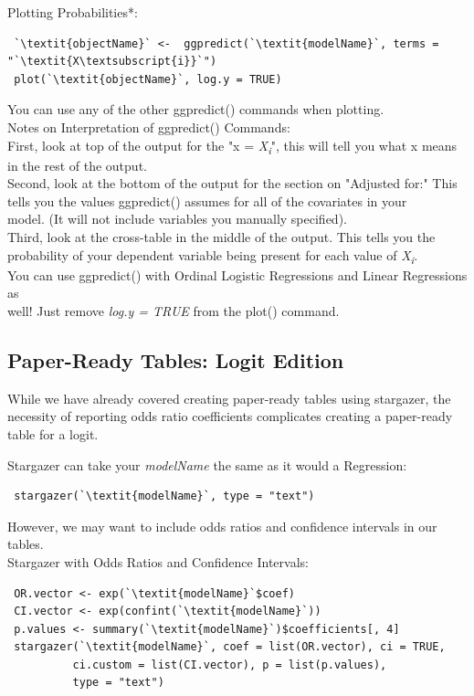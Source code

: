 \documentclass[12pt,letterpaper]{article}
\newcommand{\ind}{\phantom{AA}}
\begin{document}
\begin{tcolorbox}[title = Predicted Probabilities]
\begin{lstlisting}
\end{lstlisting}
Plotting Probabilities*: 
\begin{lstlisting}
 `\textit{objectName}` <-  ggpredict(`\textit{modelName}`, terms = "`\textit{X\textsubscript{i}}`")
 plot(`\textit{objectName}`, log.y = TRUE)
\end{lstlisting} {\small * You can use any of the other ggpredict() commands when plotting.} \vspace{.5em}\\
Notes on Interpretation of ggpredict() Commands: \\
\ind First, look at top of the output for the "x = \textit{X\textsubscript{i}}", this will tell you what x means\\ \ind \ind in the rest of the output.\\
\ind Second, look at the bottom of the output for the section on "Adjusted for:" This\\ \ind \ind tells you the values ggpredict() assumes for all of the covariates in your \\ \ind \ind model. (It will not include variables you manually specified).\\
\ind Third, look at the cross-table in the middle of the output. This tells you the\\ \ind \ind probability of your dependent variable being present for each value of \textit{X\textsubscript{i}}. \vspace{.5em}\\
You can use ggpredict() with Ordinal Logistic Regressions and Linear Regressions as \\ \ind well! Just remove \textit{log.y = TRUE} from the plot() command.
\end{tcolorbox}

\subsection{Paper-Ready Tables: Logit Edition}
While we have already covered creating paper-ready tables using stargazer, the necessity of reporting odds ratio coefficients complicates creating a paper-ready table for a logit.
\begin{tcolorbox}[title = Paper-Ready Tables: Logit Edition]
Stargazer can take your \textit{modelName} the same as it would a Regression:
\begin{lstlisting}
 stargazer(`\textit{modelName}`, type = "text")
\end{lstlisting}
However, we may want to include odds ratios and confidence intervals in our tables. \vspace{.5em}\\
Stargazer with Odds Ratios and Confidence Intervals:
\begin{lstlisting}
 OR.vector <- exp(`\textit{modelName}`$coef)
 CI.vector <- exp(confint(`\textit{modelName}`))
 p.values <- summary(`\textit{modelName}`)$coefficients[, 4]
 stargazer(`\textit{modelName}`, coef = list(OR.vector), ci = TRUE, 
          ci.custom = list(CI.vector), p = list(p.values), 
          type = "text")
\end{lstlisting}
\end{tcolorbox}
\end{document}

